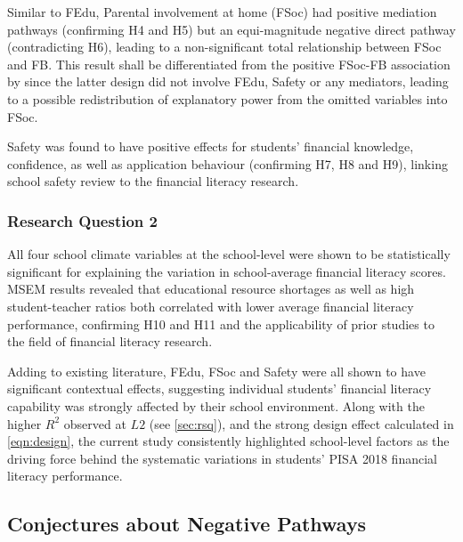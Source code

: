 Similar to FEdu, Parental involvement at home (FSoc) had positive mediation pathways (confirming H4 and H5) but an equi-magnitude negative direct pathway (contradicting H6), leading to a non-significant total relationship between FSoc and FB. This result shall be differentiated from the positive FSoc-FB association by \citet{morenoherrero:2018a} since the latter design did not involve FEdu, Safety or any mediators, leading to a possible redistribution of explanatory power from the omitted variables into FSoc.

Safety was found to have positive effects for students' financial knowledge, confidence, as well as application behaviour (confirming H7, H8 and H9), linking  school safety review to the financial literacy research.

\subsubsection{Research Question 2}

All four school climate variables at the school-level were shown to be statistically significant for explaining the variation in school-average financial literacy scores. MSEM results revealed that educational resource shortages as well as high student-teacher ratios both correlated with lower average financial literacy performance, confirming H10 and H11 and the applicability of prior studies \citep{finn:1999, miles:1998, uline:2008} to the field of financial literacy research.

Adding to existing literature, FEdu, FSoc and Safety were all shown to have significant contextual effects, suggesting individual students' financial literacy capability was strongly affected by their school environment. Along with the higher $R^2$ observed at $L2$ (see \cref{sec:rsq}), and the strong design effect calculated in \cref{eqn:design}, the current study consistently highlighted school-level factors as the driving force behind the systematic variations in students' PISA 2018 financial literacy performance.

\subsection{Conjectures about Negative Pathways}\label{sec:conj}

